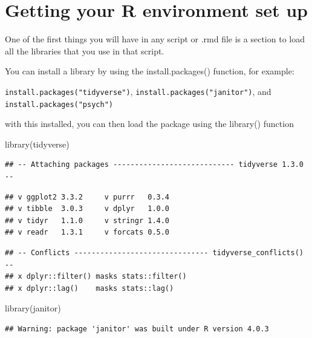 \documentclass[
]{book}
\newenvironment{Shaded}{\begin{snugshade}}{\end{snugshade}}
\newcommand{\FunctionTok}[1]{\textcolor[rgb]{0.00,0.00,0.00}{#1}}
\newcommand{\NormalTok}[1]{#1}
\begin{document}
\hypertarget{getting-your-r-environment-set-up}{%
\section{Getting your R environment set up}\label{getting-your-r-environment-set-up}}

One of the first things you will have in any script or .rmd file is a section to load all the libraries that you use in that script.

You can install a library by using the install.packages() function, for example:

\texttt{install.packages("tidyverse")}, \texttt{install.packages("janitor")}, and \texttt{install.packages("psych")}

with this installed, you can then load the package using the library() function

\begin{Shaded}
\begin{Highlighting}[]
\FunctionTok{library}\NormalTok{(tidyverse)}
\end{Highlighting}
\end{Shaded}

\begin{verbatim}
## -- Attaching packages ---------------------------- tidyverse 1.3.0 --
\end{verbatim}

\begin{verbatim}
## v ggplot2 3.3.2     v purrr   0.3.4
## v tibble  3.0.3     v dplyr   1.0.0
## v tidyr   1.1.0     v stringr 1.4.0
## v readr   1.3.1     v forcats 0.5.0
\end{verbatim}

\begin{verbatim}
## -- Conflicts ------------------------------- tidyverse_conflicts() --
## x dplyr::filter() masks stats::filter()
## x dplyr::lag()    masks stats::lag()
\end{verbatim}

\begin{Shaded}
\begin{Highlighting}[]
\FunctionTok{library}\NormalTok{(janitor)}
\end{Highlighting}
\end{Shaded}

\begin{verbatim}
## Warning: package 'janitor' was built under R version 4.0.3
\end{verbatim}
\end{document}

